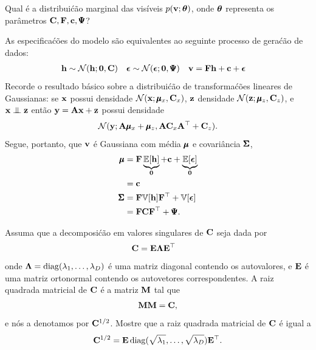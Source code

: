 \begin{exenumerate}
    
    \item Qual \'e a distribui\'c\~ao marginal das vis\'iveis $p(\mathbf{v}; \boldsymbol{\theta})$, onde $\boldsymbol{\theta}$ representa os par\^ametros $\mathbf{C}, \mathbf{F}, \mathbf{c}, \pmb{\Psi}$?
    
    \begin{solution}
        As especifica\'c\~oes do modelo s\~ao equivalentes ao seguinte processo de gera\'c\~ao de dados:
        \begin{align}
            \mathbf{h} &\sim \mathcal{N}(\mathbf{h}; \boldsymbol{0}, \mathbf{C}) & \boldsymbol{\epsilon} &\sim \mathcal{N}(\boldsymbol{\epsilon}; \boldsymbol{0}, \pmb{\Psi}) &  \mathbf{v} &= \mathbf{F} \mathbf{h} + \mathbf{c} + \boldsymbol{\epsilon}
        \end{align}
        Recorde o resultado b\'asico sobre a distribui\'c\~ao de transforma\'c\~oes lineares
        de Gaussianas: se $\mathbf{x}$ possui densidade $\mathcal{N}(\mathbf{x};
        \pmb{\mu}_x, \mathbf{C}_x)$, $\mathbf{z}$ densidade $\mathcal{N}(\mathbf{z}; \pmb{\mu}_z, \mathbf{C}_z)$, e $\mathbf{x}
        \mathrel{\perp\mspace{-10mu}\perp} \mathbf{z}$ ent\~ao $\mathbf{y} = \mathbf{A} \mathbf{x} + \mathbf{z}$ possui densidade
        $$\mathcal{N}(\mathbf{y}; \mathbf{A}\pmb{\mu}_x+\pmb{\mu}_z, \mathbf{A} \mathbf{C}_x \mathbf{A}^\top + \mathbf{C}_z).$$
        Segue, portanto, que $\mathbf{v}$ \'e Gaussiana com m\'edia $\pmb{\mu}$ e covari\^ancia $\pmb{\Sigma}$,
        \begin{align}
            \pmb{\mu} &= \mathbf{F} \underbrace{\mathbb{E}[\mathbf{h}]}_{\boldsymbol{0}} + \mathbf{c} + \underbrace{\mathbb{E}[\boldsymbol{\epsilon}]}_{\boldsymbol{0}}\\
            & = \mathbf{c}\\
            \pmb{\Sigma} &= \mathbf{F} \mathbb{V}[\mathbf{h}] \mathbf{F}^\top + \mathbb{V}[\boldsymbol{\epsilon}]\\
            & = \mathbf{F} \mathbf{C} \mathbf{F}^\top + \pmb{\Psi}.
        \end{align}
        
        
    \end{solution}
    
    \item Assuma que a decomposi\'c\~ao em valores singulares de $\mathbf{C}$ seja dada por
    \begin{align}
        \mathbf{C} & = \mathbf{E} \mathbf{\Lambda} \mathbf{E}^\top
    \end{align}
    onde $\mathbf{\Lambda} = \operatorname{diag}(\lambda_1, \ldots, \lambda_D)$ \'e uma matriz diagonal
    contendo os autovalores, e $\mathbf{E}$ \'e uma matriz ortonormal
    contendo os autovetores correspondentes. A raiz quadrada matricial de $\mathbf{C}$ \'e a matriz $\mathbf{M}$ tal que
    \begin{align}
        \mathbf{M} \mathbf{M} = \mathbf{C},
    \end{align}
    e n\'os a denotamos por $\mathbf{C}^{1/2}$. Mostre que a raiz quadrada matricial de
    $\mathbf{C}$ \'e igual a
    \begin{align}
        \mathbf{C}^{1/2} = \mathbf{E} \operatorname{diag}(\sqrt{\lambda_1}, \ldots, \sqrt{\lambda_D}) \mathbf{E}^\top.
    \end{align}
    

\end{exenumerate}
